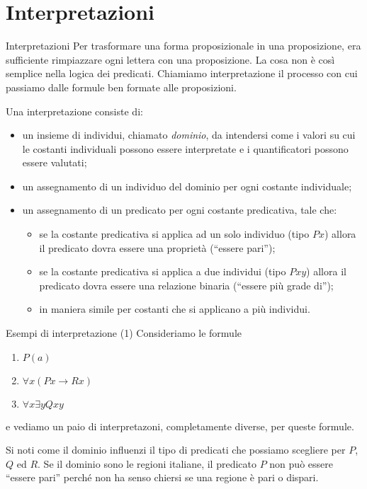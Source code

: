 \documentclass[aspectratio=169,10pt,dvipsnames,xcolor=table,handout]{beamer}
\begin{document}
\section{Interpretazioni}

\begin{frame}{Interpretazioni}
    Per trasformare una forma proposizionale in una proposizione, era sufficiente rimpiazzare ogni lettera con una proposizione. La cosa non è così semplice nella logica dei predicati. Chiamiamo \alert{interpretazione} il processo con cui passiamo dalle formule ben formate alle proposizioni.

    \begin{definition}
        Una \alert{interpretazione} consiste di:
        \begin{itemize}
            \item un insieme di individui, chiamato \emph{dominio}, da intendersi come i valori su cui le costanti individuali possono essere interpretate e i quantificatori possono essere valutati;
            \item un assegnamento di un individuo del dominio per ogni costante individuale;
            \item un assegnamento di un predicato per ogni costante predicativa, tale che:
                  \begin{itemize}
                      \item se la costante predicativa si applica ad un solo individuo (tipo $Px$) allora il predicato dovra essere una proprietà (``essere pari'');
                      \item se la costante predicativa si applica a due individui (tipo $Pxy$) allora il predicato dovra essere una relazione binaria (``essere più grade di'');
                      \item in maniera simile per costanti che si applicano a più individui.
                  \end{itemize}
        \end{itemize}
    \end{definition}
\end{frame}

\begin{frame}{Esempi di interpretazione (1)}
    Consideriamo le formule
    \begin{enumerate}
        \item $P(a)$
        \item $\forall x (P x \to R x)$
        \item $\forall x \exists y Qxy$
    \end{enumerate}
    e vediamo un paio di interpretazoni, completamente diverse, per queste formule.

    \medskip
    Si noti come il dominio influenzi il tipo di predicati che possiamo scegliere per $P$, $Q$ ed $R$. Se il dominio sono le regioni italiane, il predicato $P$ non può essere ``essere pari'' perché non ha senso chiersi se una regione è pari o dispari.
\end{frame}
\end{document}
